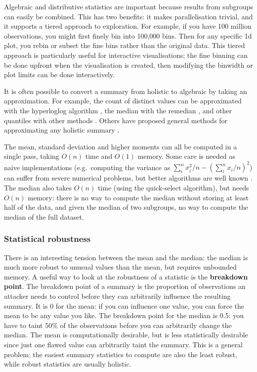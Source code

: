 \documentclass[journal]{vgtc}                %
\begin{document}
Algebraic and distributive statistics are important because results from subgroups can easily be combined. This has two benefits: it makes parallelisation trivial, and it supports a tiered approach to exploration. For example, if you have 100 million observations, you might first finely bin into 100,000 bins. Then for any specific 1d plot, you rebin or subset the fine bins rather than the original data. This tiered approach is particularly useful for interactive visualisations; the fine binning can be done upfront when the visualisation is created, then modifying the binwidth or plot limits can be done interactively.

It is often possible to convert a summary from holistic to algebraic by taking an approximation. For example, the count of distinct values can be approximated with the hyperloglog algorithm \citep{flajolet:2007}, the median with the remedian \citep{rousseeuw:1990}, and other quantiles with other methods \citep{finkelstein:1994,hurley:1995,liechty:2003}. Others have proposed general methods for approximating any holistic summary \citep{christmann:2007}.

The mean, standard deviation and higher moments can all be computed in a single pass, taking $O(n)$ time and $O(1)$ memory. Some care is needed as naive implementations (e.g.\ computing the variance as $\sum_i^n x_i^2 / n - \left( \sum_i^n x_i / n \right)^2$) can suffer from severe numerical problems, but better algorithms are well known \citep{welford:1962}. The median also takes $O(n)$ time (using the quick-select algorithm), but needs $O(n)$ memory: there is no way to compute the median without storing at least half of the data, and given the median of two subgroups, no way to compute the median of the full dataset.

\subsubsection{Statistical robustness}

There is an interesting tension between the mean and the median: the median is much more robust to unusual values than the mean, but requires unbounded memory. A useful way to look at the robustness of a statistic is the {\bf breakdown point}. The breakdown point of a summary is the proportion of observations an attacker needs to control before they can arbitrarily influence the resulting summary. It is 0 for the mean: if you can influence one value, you can force the mean to be any value you like. The breakdown point for the median is 0.5: you have to taint 50\% of the observations before you can arbitrarily change the median. The mean is computationally desirable, but is less statistically desirable since just one flawed value can arbitrarily taint the summary. This is a general problem: the easiest summary statistics to compute are also the least robust, while robust statistics are usually holistic.
\end{document}
